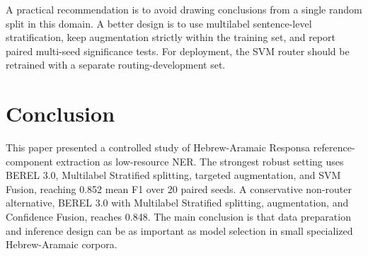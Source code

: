 \documentclass[11pt,a4paper]{article}
\begin{document}
A practical recommendation is to avoid drawing conclusions from a single random split in this domain. A better design is to use multilabel sentence-level stratification, keep augmentation strictly within the training set, and report paired multi-seed significance tests. For deployment, the SVM router should be retrained with a separate routing-development set.

\section{Conclusion}
This paper presented a controlled study of Hebrew-Aramaic Responsa reference-component extraction as low-resource NER. The strongest robust setting uses BEREL 3.0, Multilabel Stratified splitting, targeted augmentation, and SVM Fusion, reaching 0.852 mean F1 over 20 paired seeds. A conservative non-router alternative, BEREL 3.0 with Multilabel Stratified splitting, augmentation, and Confidence Fusion, reaches 0.848. The main conclusion is that data preparation and inference design can be as important as model selection in small specialized Hebrew-Aramaic corpora.
\end{document}
